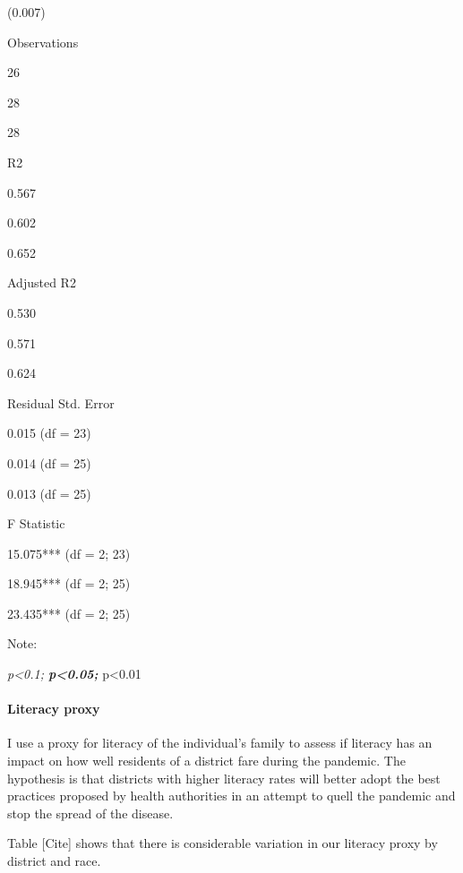 \documentclass[fleqn,10pt,lineno]{wlpeerj} %
\begin{document}
(0.007)

Observations

26

28

28

R2

0.567

0.602

0.652

Adjusted R2

0.530

0.571

0.624

Residual Std. Error

0.015 (df = 23)

0.014 (df = 25)

0.013 (df = 25)

F Statistic

15.075*** (df = 2; 23)

18.945*** (df = 2; 25)

23.435*** (df = 2; 25)

Note:

\emph{p\textless0.1; \textbf{p\textless0.05; }}p\textless0.01

\hypertarget{literacy-proxy}{%
\paragraph{Literacy proxy}\label{literacy-proxy}}

I use a proxy for literacy of the individual's family to assess if literacy has an impact on how well residents of a district fare during the pandemic. The hypothesis is that districts with higher literacy rates will better adopt the best practices proposed by health authorities in an attempt to quell the pandemic and stop the spread of the disease.

Table {[}Cite{]} shows that there is considerable variation in our literacy proxy by district and race.
\end{document}
